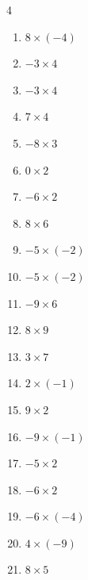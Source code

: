 \begin{multicols}{4}
\begin{enumerate}
  \item $8\times (-4)$
        \phantom{$=-32$}

  \item $-3\times 4$
        \phantom{$=-12$}

  \item $-3\times 4$
        \phantom{$=-12$}

  \item $7\times 4$
        \phantom{$=28$}

  \item $-8\times 3$
        \phantom{$=-24$}

  \item $0\times 2$
        \phantom{$=0$}

  \item $-6\times 2$
        \phantom{$=-12$}

\columnbreak %

  \item $8\times 6$
        \phantom{$=48$}

  \item $-5\times (-2)$
        \phantom{$=10$}

  \item $-5\times (-2)$
        \phantom{$=10$}

  \item $-9\times 6$
        \phantom{$=-54$}

  \item $8\times 9$
        \phantom{$=72$}

  \item $3\times 7$
        \phantom{$=21$}

  \item $2\times (-1)$
        \phantom{$=-2$}

  \item $9\times 2$
        \phantom{$=18$}

  \item $-9\times (-1)$
        \phantom{$=9$}

  \item $-5\times 2$
        \phantom{$=-10$}

  \item $-6\times 2$
        \phantom{$=-12$}

  \item $-6\times (-4)$
        \phantom{$=24$}

  \item $4\times (-9)$
        \phantom{$=-36$}

  \item $8\times 5$
        \phantom{$=40$}


\end{enumerate}
\end{multicols}
